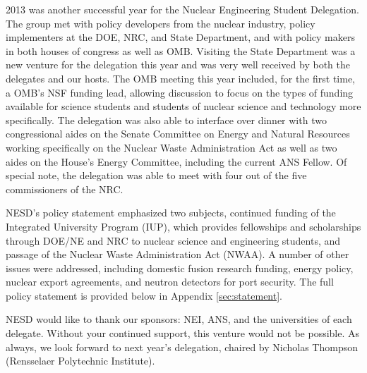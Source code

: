 
2013 was another successful year for the Nuclear Engineering Student
Delegation. The group met with policy developers from the nuclear industry,
policy implementers at the DOE, NRC, and State Department, and with policy
makers in both houses of congress as well as OMB. Visiting the State Department
was a new venture for the delegation this year and was very well received by
both the delegates and our hosts. The OMB meeting this year included, for the
first time, a OMB's NSF funding lead, allowing discussion to focus on the types
of funding available for science students and students of nuclear science and
technology more specifically. The delegation was also able to interface over
dinner with two congressional aides on the Senate Committee on Energy and
Natural Resources working specifically on the Nuclear Waste Administration Act
as well as two aides on the House's Energy Committee, including the current ANS
Fellow. Of special note, the delegation was able to meet with four out of the
five commissioners of the NRC.

NESD's policy statement emphasized two subjects, continued funding of the
Integrated University Program (IUP), which provides fellowships and scholarships
through DOE/NE and NRC to nuclear science and engineering students, and passage
of the Nuclear Waste Administration Act (NWAA). A number of other issues were
addressed, including domestic fusion research funding, energy policy, nuclear
export agreements, and neutron detectors for port security. The full policy
statement is provided below in Appendix \ref{sec:statement}.

NESD would like to thank our sponsors: NEI, ANS, and the universities of each
delegate. Without your continued support, this venture would not be possible. As
always, we look forward to next year's delegation, chaired by Nicholas Thompson
(Rensselaer Polytechnic Institute).
